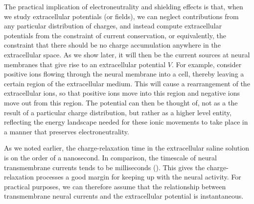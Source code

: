 The practical implication of electroneutrality and shielding effects is that, when we study extracellular potentials (or fields), we can neglect contributions from any particular distribution of charges, and instead compute extracellular potentials from the constraint of current conservation, or equivalently, the constraint that  there should be no charge accumulation anywhere in the extracellular space. As we show later, it will then be the current sources at neural membranes that give rise to an extracellular potential $V$. For example, consider positive ions flowing through the neural membrane into a cell, thereby leaving a certain region of the extracellular medium. This will cause a rearrangement of the extracellular ions, so that positive ions move into this region and negative ions move out from this region. The potential can then be thought of, not as a the result of a particular charge distribution, but rather as a higher level entity, reflecting the energy landscape needed for these ionic movements to take place in a manner that preserves electroneutrality. 

As we noted earlier, the charge-relaxation time in the extracellular saline solution is on the order of a nanosecond. In comparison, the timescale of neural transmembrane currents tends to be milliseconds (). This gives the charge-relaxation processes a good margin for keeping up with the neural activity. For practical purposes, we can therefore assume that the relationship between transmembrane neural currents and the extracellular potential is instantaneous.


